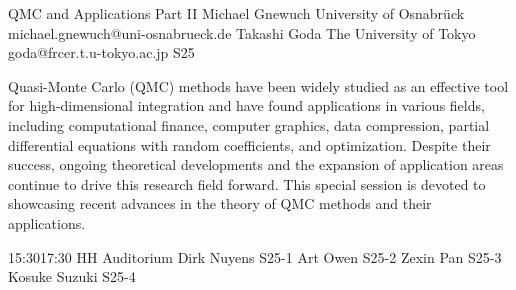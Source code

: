 \documentclass[12pt,lettersize,oneside]{book} %
\begin{document}
\begin{session}
 {QMC and Applications Part II}%
 {Michael Gnewuch}%
 {University of Osnabr\"uck}%
 {michael.gnewuch@uni-osnabrueck.de}%
 {Takashi Goda}%
 {The University of Tokyo}%
 {goda@frcer.t.u-tokyo.ac.jp}%
 {S25}%
 {}%

 Quasi-Monte Carlo (QMC) methods have been widely studied as an effective tool for high-dimensional integration and have found applications in various fields, including computational finance, computer graphics, data compression, partial differential equations with random coefficients, and %
 optimization.
 Despite their success, ongoing theoretical developments and the expansion of application areas continue to drive this research field forward. This special session is devoted to showcasing recent advances in the theory of QMC methods and their applications.
\end{session}



\sessionPart{}%
{\hfill{}
{15:30}{17:30} %
{HH Auditorium}} %
{Dirk Nuyens}
{S25-1}
{Art Owen}
{S25-2}
{Zexin Pan}
{S25-3}
{Kosuke Suzuki}
{S25-4}



\clearpage
\end{document}
